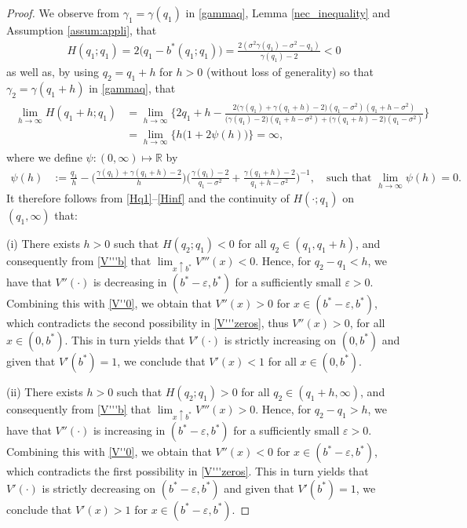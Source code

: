 \documentclass[11pt]{article} %
\def\R{\mathbb{R}}
\numberwithin{komcounter}{section}
\renewcommand{\epsilon}{\varepsilon}
\begin{document}
\begin{proof}
We observe from $\gamma_1 = \gamma(q_1)$ in \eqref{gammaq}, Lemma \ref{nec_inequality} and Assumption \ref{assum:appli}, that   
\begin{align} \label{Hq1}
H(q_1;q_1) 
= 2 \big(q_1 - b^*(q_1;q_1)\big)
= \frac{2 ( \sigma^2 \gamma(q_1) - \sigma^2 - q_1)}{\gamma(q_1) - 2} < 0 
\end{align}
as well as, by using $q_2=q_1+h$ for $h>0$ (without loss of generality) so that $\gamma_2 = \gamma(q_1 + h)$ in \eqref{gammaq}, that  
\begin{align} \label{Hinf}
\begin{split}
\lim_{h \to \infty} H(q_1+h;q_1) 
&= \lim_{h \to \infty} \Big\{ 2 q_1 + h - \frac{2\big(\gamma(q_1) + \gamma(q_1+h) - 2\big)(q_1 - \sigma^2)(q_1+h - \sigma^2)}{\big(\gamma(q_1) - 2\big)(q_1+h - \sigma^2) + \big(\gamma(q_1+h) - 2\big)(q_1 - \sigma^2)} \Big\} \\
&= \lim_{h \to \infty} \big\{ h \big(1 + 2 \psi(h)\big) \big\} = \infty,
\end{split}
\end{align}
where we define $\psi:(0,\infty)\mapsto \R$ by  
\begin{align*}
\psi(h) 
&:= \frac{q_1}{h} - \Big(\frac{\gamma(q_1) + \gamma(q_1+h) - 2}{h} \Big) \Big(\frac{\gamma(q_1) - 2}{q_1 - \sigma^2} + \frac{\gamma(q_1+h) - 2}{q_1+h - \sigma^2} \Big)^{-1} , 
\quad \text{such that } \lim_{h \to \infty} \psi(h) = 0. 
\end{align*}
It therefore follows from \eqref{Hq1}--\eqref{Hinf} and the continuity of $H(\cdot;q_1)$ on $(q_1,\infty)$ that: 

(i) There exists $h>0$ such that $H(q_2;q_1)<0$ for all $q_2 \in (q_1, q_1 + h)$, and consequently from \eqref{V'''b} that $\lim_{x \uparrow b^*} V'''(x) < 0$. 
Hence, for $q_2 - q_1 < h$, we have  that $V''(\cdot)$ is decreasing in $(b^*-\epsilon, b^*)$ for a sufficiently small $\epsilon>0$.
Combining this with \eqref{V''0}, we obtain that $V''(x)>0$ for $x \in (b^*-\epsilon, b^*)$, which contradicts the second possibility in \eqref{V'''zeros}, thus $V''(x)>0$, for all $x \in (0,b^*)$. 
This in turn yields that $V'(\cdot)$ is strictly increasing on $(0,b^*)$ and given that $V'(b^*)=1$, we conclude that $V'(x) < 1$ for all $x \in (0,b^*)$.

(ii) There exists $h>0$ such that $H(q_2;q_1)>0$ for all $q_2 \in (q_1 + h,\infty)$, and consequently from \eqref{V'''b} that $\lim_{x \uparrow b^*} V'''(x) > 0$. 
Hence, for $q_2 - q_1 > h$, we have that $V''(\cdot)$ is increasing in $(b^*-\epsilon, b^*)$ for a sufficiently small $\epsilon>0$.
Combining this with \eqref{V''0}, we obtain that $V''(x)<0$ for $x \in (b^*-\epsilon, b^*)$, which contradicts the first possibility in \eqref{V'''zeros}.
This in turn yields that $V'(\cdot)$ is strictly decreasing on $(b^*-\epsilon, b^*)$ and given that $V'(b^*)=1$, we conclude that $V'(x) > 1$ for $x \in (b^*-\epsilon, b^*)$.
\end{proof}
\end{document}
